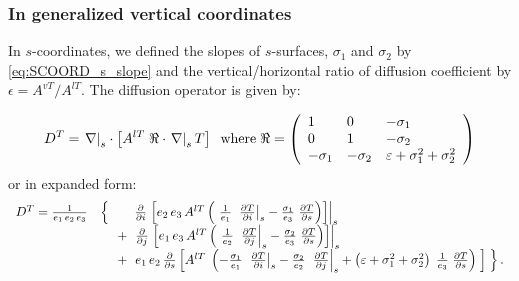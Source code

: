 \documentclass[../main/NEMO_manual]{subfiles}
\begin{document}
\subsubsection*{In generalized vertical coordinates}

In $s$-coordinates, we defined the slopes of $s$-surfaces, $\sigma_1$ and $\sigma_2$ by \autoref{eq:SCOORD_s_slope} and
the vertical/horizontal ratio of diffusion coefficient by $\epsilon = A^{vT} / A^{lT}$.
The diffusion operator is given by:

\begin{equation}
  \label{eq:DIFFOPERS_2}
  D^T = \left. \nabla \right|_s \cdot
  \left[ A^{lT} \;\Re \cdot \left. \nabla \right|_s T  \right] \\
  \;\;\text{where} \;\Re =\left( {{
        \begin{array}{*{20}c}
          1 \hfill & 0 \hfill & {-\sigma_1 } \hfill \\
          0 \hfill & 1 \hfill & {-\sigma_2 } \hfill \\
          {-\sigma_1 } \hfill & {-\sigma_2 } \hfill & {\varepsilon +\sigma_1
                                                      ^2+\sigma_2 ^2} \hfill \\
        \end{array}
      }} \right)
\end{equation}
or in expanded form:
\begin{align*}
  {
  \begin{array}{*{20}l}
    D^T= \frac{1}{e_1\,e_2\,e_3 } & \left\{ \quad \quad \frac{\partial }{\partial i}  \left. \left[  e_2\,e_3 \, A^{lT}
                               \left( \  \frac{1}{e_1}\; \left. \frac{\partial T}{\partial i} \right|_s
                                       -\frac{\sigma_1 }{e_3 } \; \frac{\partial T}{\partial s} \right) \right]  \right|_s  \right. \\
        &  \quad \  +   \            \left.   \frac{\partial }{\partial j}  \left. \left[  e_1\,e_3 \, A^{lT}
                               \left( \ \frac{1}{e_2 }\; \left. \frac{\partial T}{\partial j} \right|_s
                                       -\frac{\sigma_2 }{e_3 } \; \frac{\partial T}{\partial s} \right) \right]  \right|_s  \right. \\
        &  \quad \  +   \           \left.  e_1\,e_2\, \frac{\partial }{\partial s}  \left[ A^{lT} \; \left(
	                  -\frac{\sigma_1 }{e_1 } \; \left. \frac{\partial T}{\partial i} \right|_s
	                  -\frac{\sigma_2 }{e_2 } \; \left. \frac{\partial T}{\partial j} \right|_s
                          +\left( \varepsilon +\sigma_1^2+\sigma_2 ^2 \right) \; \frac{1}{e_3 } \; \frac{\partial T}{\partial s} \right) \; \right] \;  \right\} .
  \end{array}
          }
\end{align*}
\end{document}
